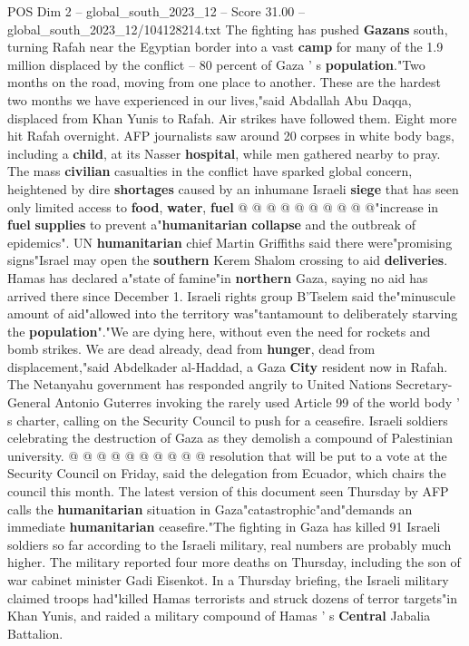 \begin{textsample}{POS Dim 2 – global\_south\_2023\_12 – Score 31.00 – global\_south\_2023\_12/104128214.txt}
The fighting has pushed \textbf{Gazans} south, turning Rafah near the Egyptian border into a vast \textbf{camp} for many of the 1.9 million displaced by the conflict -- 80 percent of Gaza ' s \textbf{population}."Two months on the road, moving from one place to another.
These are the hardest two months we have experienced in our lives,"said Abdallah Abu Daqqa, displaced from Khan Yunis to Rafah.
Air strikes have followed them.
Eight more hit Rafah overnight.
AFP journalists saw around 20 corpses in white body bags, including a \textbf{child}, at its Nasser \textbf{hospital}, while men gathered nearby to pray.
The mass \textbf{civilian} casualties in the conflict have sparked global concern, heightened by dire \textbf{shortages} caused by an inhumane Israeli \textbf{siege} that has seen only limited access to \textbf{food}, \textbf{water}, \textbf{fuel} @ @ @ @ @ @ @ @ @ @"increase in \textbf{fuel} \textbf{supplies} to prevent a"\textbf{humanitarian} \textbf{collapse} and the outbreak of epidemics".
UN \textbf{humanitarian} chief Martin Griffiths said there were"promising signs"Israel may open the \textbf{southern} Kerem Shalom crossing to aid \textbf{deliveries}.
Hamas has declared a"state of famine"in \textbf{northern} Gaza, saying no aid has arrived there since December 1.
Israeli rights group B'Tselem said the"minuscule amount of aid"allowed into the territory was"tantamount to deliberately starving the \textbf{population}"."We are dying here, without even the need for rockets and bomb strikes.
We are dead already, dead from \textbf{hunger}, dead from displacement,"said Abdelkader al-Haddad, a Gaza \textbf{City} resident now in Rafah.
The Netanyahu government has responded angrily to United Nations Secretary-General Antonio Guterres invoking the rarely used Article 99 of the world body ' s charter, calling on the Security Council to push for a ceasefire.
Israeli soldiers celebrating the destruction of Gaza as they demolish a compound of Palestinian university. @ @ @ @ @ @ @ @ @ @ resolution that will be put to a vote at the Security Council on Friday, said the delegation from Ecuador, which chairs the council this month.
The latest version of this document seen Thursday by AFP calls the \textbf{humanitarian} situation in Gaza"catastrophic"and"demands an immediate \textbf{humanitarian} ceasefire."The fighting in Gaza has killed 91 Israeli soldiers so far according to the Israeli military, real numbers are probably much higher.
The military reported four more deaths on Thursday, including the son of war cabinet minister Gadi Eisenkot.
In a Thursday briefing, the Israeli military claimed troops had"killed Hamas terrorists and struck dozens of terror targets"in Khan Yunis, and raided a military compound of Hamas ' s \textbf{Central} Jabalia Battalion.

\end{textsample}
